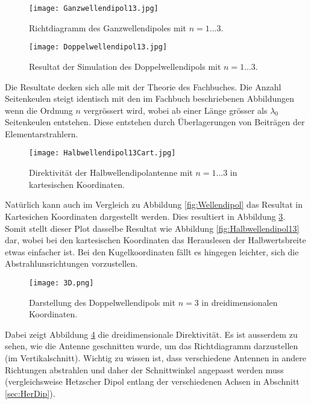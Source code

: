\begin{figure}[!ht]
	\centering
    \texttt{[image: Ganzwellendipol13.jpg]}
    \caption{Richtdiagramm des Ganzwellendipoles mit $n = 1 ... 3$.}
    \label{fig:Ganzwellendipol13}
\end{figure}

\newpage

\begin{figure}[!ht]
	\centering
    \texttt{[image: Doppelwellendipol13.jpg]}
    \caption{Resultat der Simulation des Doppelwellendipols mit $n = 1 ... 3$.}
    \label{fig:Doppelwellendipol13}
\end{figure}

Die Resultate decken sich alle mit der Theorie des Fachbuches. Die Anzahl Seitenkeulen steigt identisch mit den im Fachbuch beschriebenen Abbildungen wenn die Ordnung $n$ vergrössert wird, wobei ab einer Länge grösser als $\lambda_0$ Seitenkeulen entstehen. Diese entstehen durch Überlagerungen von Beiträgen der Elementarstrahlern.

\begin{figure}[!ht]
	\centering
    \texttt{[image: Halbwellendipol13Cart.jpg]}
    \caption{Direktivität der Halbwellendipolantenne mit $n = 1 ... 3$ in kartesischen Koordinaten.}
    \label{fig:Halbwellendipol13Cart}
\end{figure}

\newpage

Natürlich kann auch im Vergleich zu Abbildung \ref{fig:Wellendipol} das Resultat in Kartesichen Koordinaten dargestellt werden. Dies resultiert in Abbildung \ref{fig:Halbwellendipol13Cart}. Somit stellt dieser Plot dasselbe Resultat wie Abbildung \ref{fig:Halbwellendipol13} dar, wobei bei den kartesischen Koordinaten das Herauslesen der Halbwertsbreite etwas einfacher ist. Bei den Kugelkoordinaten fällt es hingegen leichter, sich die Abstrahlunsrichtungen vorzustellen.

\begin{figure}[!ht]
	\centering
    \texttt{[image: 3D.png]}
    \caption{Darstellung des Doppelwellendipols mit $n = 3$ in dreidimensionalen Koordinaten.}
    \label{fig:3D}
\end{figure}

Dabei zeigt Abbildung \ref{fig:3D} die dreidimensionale Direktivität. Es ist ausserdem zu sehen, wie die Antenne geschnitten wurde, um das Richtdiagramm darzustellen (im Vertikalschnitt). Wichtig zu wissen ist, dass verschiedene Antennen in andere Richtungen abstrahlen und daher der Schnittwinkel angepasst werden muss (vergleichsweise Hetzscher Dipol entlang der verschiedenen Achsen in Abschnitt \ref{sec:HerDip}).